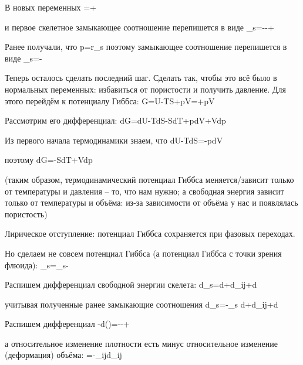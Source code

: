 \documentclass[main.tex]{subfiles}
\begin{document}
В новых переменных
\beq
{}=+\frac{\partial\varphi}{\partial\theta}
\eeq

и первое скелетное замыкающее соотношение перепишется в виде
\beq
\eta_s=--\frac{\partial\varphi}{\partial\theta}+\frac{\partial\varphi}{\partial\theta}
\eeq

Ранее получали, что 
\beq
p=r_s
\eeq
поэтому замыкающее соотношение перепишется в виде
\beq
\eta_s=-
\eeq

Теперь осталось сделать последний шаг. Сделать так, чтобы это всё было в нормальных переменных: избавиться от пористости и получить давление.
Для этого перейдём к потенциалу Гиббса:
\beq
G=U-TS+pV=\Psi+pV
\eeq

Рассмотрим его дифференциал:
\beq
dG=dU-TdS-SdT+pdV+Vdp
\eeq

Из первого начала термодинамики знаем, что
\beq
dU-TdS=-pdV
\eeq

поэтому
\beq
dG=-SdT+Vdp
\eeq

(таким образом, термодинамический потенциал Гиббса меняется/зависит только от температуры и давления -- то, что нам нужно; а свободная энергия зависит только от температуры и объёма: из-за зависимости от объёма у нас и появлялась пористость)

Лирическое отступление: потенциал Гиббса сохраняется при фазовых переходах.

Но сделаем не совсем потенциал Гиббса (а потенциал Гиббса с точки зрения флюида):
\beq
\Phi_s=\tilde{\Psi}_s-
\eeq

Распишем дифференциал свободной энергии скелета:
\beq
d\tilde{\Psi}_s=d\theta+d\varepsilon_{ij}+d\varphi
\eeq

учитывая полученные ранее замыкающие соотношения
\beq
d\tilde{\Psi}_s=-\eta_s d\theta+d\varepsilon_{ij}+d\varphi
\eeq

Распишем дифференциал
\beq
-d\left(\right)=--+
\eeq

а относительное изменение плотности есть минус относительное изменение (деформация) объёма:
\beq
{}=-\delta_{ij}d\varepsilon_{ij}
\eeq
\end{document}

